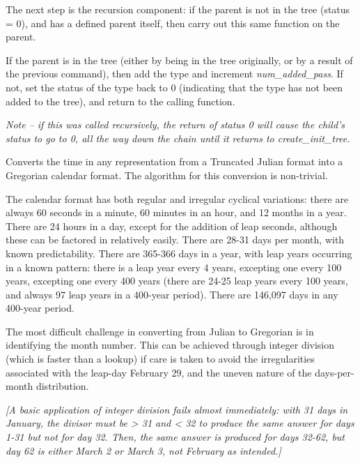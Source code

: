{\begin{enumerate}
{\begin{enumerate}
The next step is the recursion component:  if the parent is not in the
tree (status = 0), and has a defined parent itself, then carry out this
same function on the parent.

If the parent is in the tree (either by being in the tree originally, or
by a result of the previous command), then add the type and increment
\textit{num\_added\_pass}.  If not, set the status of the type back to
0 (indicating that the type has not been added to the tree), and return
to the calling function.

{\itshape
Note -- if this was called recursively, the return of status 0 will
cause the child's status to go to 0, all the way down
the chain until it returns to create\_init\_tree. }

\label{ref:calculatecalendarvalues}Converts the time in any
representation from a Truncated Julian format into a Gregorian calendar
format.  The algorithm for this conversion is non-trivial.

The calendar format has both regular and irregular cyclical variations: 
there are always 60 seconds in a minute, 60 minutes in an hour, and 12
months in a year.  There are 24 hours in a day, except for the addition
of leap seconds, although these can be factored in relatively easily. 
There are 28-31 days per month, with known predictability.  There are
365-366 days in a year, with leap years occurring in a known pattern: there is 
a leap year every 4 years, excepting one every 100 years, excepting one every 
400
years (there are 24-25 leap years every 100 years, and always 97 leap
years in a 400-year period).  There are 146,097 days in any 400-year
period.

The most difficult challenge in converting from Julian to Gregorian is
in identifying the month number.  This can be achieved through integer
division (which is faster than a lookup) if care is taken to avoid the
irregularities associated with the leap-day February 29, and the uneven
nature of the days-per-month distribution.  

{\itshape
[A basic application of integer division fails almost immediately: with
31 days in January, the divisor must be {\textgreater} 31 and
{\textless} 32 to produce the same answer for days 1-31 but not for day
32.  Then, the same answer is produced for days 32-62, but day 62 is
either March 2 or March 3, not February as intended.]}


\end{enumerate}}
\end{enumerate}}
